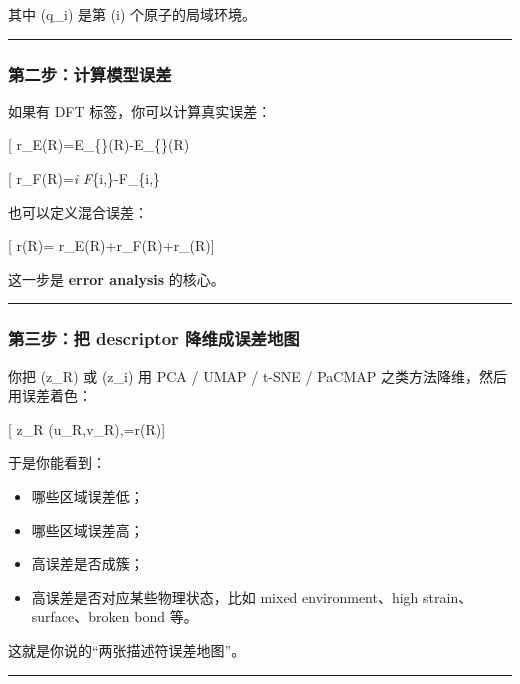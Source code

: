 \documentclass[
  12pt,
]{ctexart}
\providecommand{\tightlist}{%
  \setlength{\itemsep}{0pt}\setlength{\parskip}{0pt}}
\begin{document}
其中 (q\_i) 是第 (i) 个原子的局域环境。

\begin{center}\rule{0.5\linewidth}{0.5pt}\end{center}

\subsubsection{第二步：计算模型误差}\label{ux7b2cux4e8cux6b65ux8ba1ux7b97ux6a21ux578bux8befux5dee}

如果有 DFT 标签，你可以计算真实误差：

{[}
r\_E(R)=\textbar E\_\{\}(R)-E\_\{\}(R)\textbar{]}

{[} r\_F(R)=\sum\emph{i
\textbar F}\{i,\}-F\_\{i,\}\textbar{]}

也可以定义混合误差：

{[} r(R)= \alpha r\_E(R)+\beta r\_F(R)+\gamma r\_\sigma(R){]}

这一步是 \textbf{error analysis} 的核心。

\begin{center}\rule{0.5\linewidth}{0.5pt}\end{center}

\subsubsection{第三步：把 descriptor
降维成误差地图}\label{ux7b2cux4e09ux6b65ux628a-descriptor-ux964dux7ef4ux6210ux8befux5deeux5730ux56fe}

你把 (z\_R) 或 (z\_i) 用 PCA / UMAP / t-SNE / PaCMAP
之类方法降维，然后用误差着色：

{[} z\_R \rightarrow (u\_R,v\_R),\quad {}=r(R){]}

于是你能看到：

\begin{itemize}
\tightlist
\item
  哪些区域误差低；
\item
  哪些区域误差高；
\item
  高误差是否成簇；
\item
  高误差是否对应某些物理状态，比如 mixed environment、high
  strain、surface、broken bond 等。
\end{itemize}

这就是你说的``两张描述符误差地图''。

\begin{center}\rule{0.5\linewidth}{0.5pt}\end{center}
\end{document}
